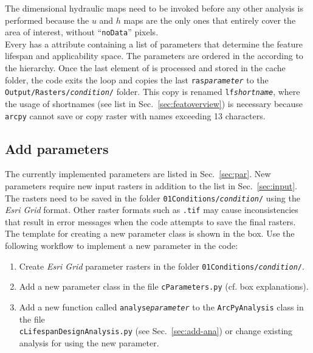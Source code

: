 The dimensional hydraulic maps need to be invoked before any other analysis is performed because the $u$ and $h$ maps are the only ones that entirely cover the area of interest, without ``\texttt{noData}'' pixels.\\
Every  has a  attribute containing a list of parameters that determine the feature lifespan and applicability space. The parameters are ordered in the  according to the hierarchy. Once the last element of  is processed and stored in the cache folder, the code exits the loop and copies the last \texttt{ras{\myUnderscore}\textit{parameter}} to the \texttt{Output/Rasters/\textit{condition}/} folder. This copy is renamed \texttt{lf{\myUnderscore}\textit{shortname}}, where the usage of shortnames (see list in Sec.~\ref{sec:featoverview}) is necessary because \texttt{arcpy} cannot save or copy raster with names exceeding 13 characters.
\clearpage
\subsection{Add parameters} \label{sec:add-par}
The currently implemented parameters are listed in Sec.~\ref{sec:par}. New parameters require new input rasters in addition to the list in Sec.~\ref{sec:input}. The rasters need to be saved in the folder \texttt{01{\myUnderscore}Conditions/\textit{condition}/} using the \textit{Esri Grid} format. Other raster formats such as \texttt{.tif} may cause inconsistencies that result in error messages when the code attempts to save the final rasters. The template for creating a new parameter class is shown in the box. Use the following workflow to implement a new parameter in the code:
\begin{enumerate}
	\item Create \textit{Esri Grid} parameter rasters in the folder \texttt{01{\myUnderscore}Conditions/\textit{condition}/}.
	\item Add a new parameter class in the file \texttt{cParameters.py} (cf. box explanations).
	\item Add a new function called \texttt{analyse{\myUnderscore}\textit{parameter}} to the \texttt{ArcPyAnalysis} class in the file \\ \texttt{cLifespanDesignAnalysis.py} (see Sec.~\ref{sec:add-ana}) or change existing analysis for using the new parameter.
\end{enumerate}

